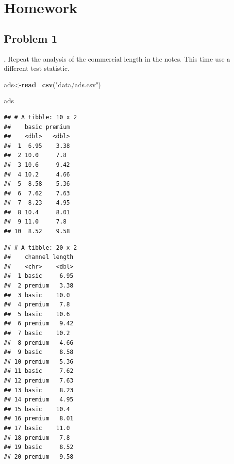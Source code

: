 \documentclass[
]{book}
\newenvironment{Shaded}{\begin{snugshade}}{\end{snugshade}}
\newcommand{\DataTypeTok}[1]{\textcolor[rgb]{0.13,0.29,0.53}{#1}}
\newcommand{\KeywordTok}[1]{\textcolor[rgb]{0.13,0.29,0.53}{\textbf{#1}}}
\newcommand{\NormalTok}[1]{#1}
\newcommand{\OperatorTok}[1]{\textcolor[rgb]{0.81,0.36,0.00}{\textbf{#1}}}
\newcommand{\StringTok}[1]{\textcolor[rgb]{0.31,0.60,0.02}{#1}}
\begin{document}
\hypertarget{homework-18}{%
\section{Homework}\label{homework-18}}

\hypertarget{problem-1-18}{%
\subsection{Problem 1}\label{problem-1-18}}

. Repeat the analysis of the commercial length in the notes. This time use a different test statistic.

\begin{Shaded}
\begin{Highlighting}[]
\NormalTok{ads<-}\KeywordTok{read_csv}\NormalTok{(}\StringTok{"data/ads.csv"}\NormalTok{)}
\end{Highlighting}
\end{Shaded}

\begin{Shaded}
\begin{Highlighting}[]
\NormalTok{ads}
\end{Highlighting}
\end{Shaded}

\begin{verbatim}
## # A tibble: 10 x 2
##    basic premium
##    <dbl>   <dbl>
##  1  6.95    3.38
##  2 10.0     7.8 
##  3 10.6     9.42
##  4 10.2     4.66
##  5  8.58    5.36
##  6  7.62    7.63
##  7  8.23    4.95
##  8 10.4     8.01
##  9 11.0     7.8 
## 10  8.52    9.58
\end{verbatim}

\begin{Shaded}
\end{Shaded}

\begin{verbatim}
## # A tibble: 20 x 2
##    channel length
##    <chr>    <dbl>
##  1 basic     6.95
##  2 premium   3.38
##  3 basic    10.0 
##  4 premium   7.8 
##  5 basic    10.6 
##  6 premium   9.42
##  7 basic    10.2 
##  8 premium   4.66
##  9 basic     8.58
## 10 premium   5.36
## 11 basic     7.62
## 12 premium   7.63
## 13 basic     8.23
## 14 premium   4.95
## 15 basic    10.4 
## 16 premium   8.01
## 17 basic    11.0 
## 18 premium   7.8 
## 19 basic     8.52
## 20 premium   9.58
\end{verbatim}
\end{document}
